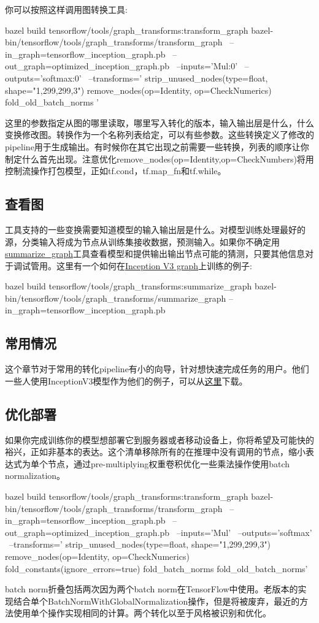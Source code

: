 你可以按照这样调用图转换工具:
\begin{bashcode}
bazel build tensorflow/tools/graph_transforms:transform_graph
bazel-bin/tensorflow/tools/graph_transforms/transform_graph \
--in_graph=tensorflow_inception_graph.pb \
--out_graph=optimized_inception_graph.pb \
--inputs='Mul:0' \
--outputs='softmax:0' \
--transforms='
strip_unused_nodes(type=float, shape="1,299,299,3")
remove_nodes(op=Identity, op=CheckNumerics)
fold_old_batch_norms
'
\end{bashcode}
这里的参数指定从图的哪里读取，哪里写入转化的版本，输入输出层是什么，什么变换修改图。转换作为一个名称列表给定，可以有些参数。这些转换定义了修改的pipeline用于生成输出。有时候你在其它出现之前需要一些转换，列表的顺序让你制定什么首先出现。注意优化remove\_nodes(op=Identity,op=CheckNumbers)将用控制流操作打包模型，正如tf.cond，tf.map\_fn和tf.while。
\subsection{查看图}
工具支持的一些变换需要知道模型的输入输出层是什么。对模型训练处理最好的源，分类输入将成为节点从训练集接收数据，预测输入。如果你不确定用\href{https://github.com/tensorflow/tensorflow/blob/master/tensorflow/tools/graph_transforms/summarize_graph_main.cc}{summarize\_graph}工具查看模型和提供输出输出节点可能的猜测，只要其他信息对于调试管用。这里有一个如何在\href{http://download.tensorflow.org/models/image/imagenet/inception-2015-12-05.tgz}{Inception V3 graph}上训练的例子:
\begin{bashcode}
bazel build tensorflow/tools/graph_transforms:summarize_graph
bazel-bin/tensorflow/tools/graph_transforms/summarize_graph --in_graph=tensorflow_inception_graph.pb 
\end{bashcode}
\subsection{常用情况}
这个章节对于常用的转化pipeline有小的向导，针对想快速完成任务的用户。他们一些人使用InceptionV3模型作为他们的例子，可以从\href{http://download.tensorflow.org/models/image/imagenet/inception-2015-12-05.tgz}{这里}下载。
\subsection{优化部署}
如果你完成训练你的模型想部署它到服务器或者移动设备上，你将希望及可能快的裕兴，正如非基本的表达。这个清单移除所有的在推理中没有调用的节点，缩小表达式为单个节点，通过pre-multiplying权重卷积优化一些乘法操作使用batch normalization。
\begin{bashcode}
bazel build tensorflow/tools/graph_transforms:transform_graph
bazel-bin/tensorflow/tools/graph_transforms/transform_graph \
--in_graph=tensorflow_inception_graph.pb \
--out_graph=optimized_inception_graph.pb \
--inputs='Mul' \
--outputs='softmax' \
--transforms='
  strip_unused_nodes(type=float, shape="1,299,299,3")
  remove_nodes(op=Identity, op=CheckNumerics)
  fold_constants(ignore_errors=true)
  fold_batch_norms
  fold_old_batch_norms'
\end{bashcode}
batch norm折叠包括两次因为两个batch norm在TensorFlow中使用。老版本的实现结合单个BatchNormWithGlobalNormalization操作，但是将被废弃，最近的方法使用单个操作实现相同的计算。两个转化以至于风格被识别和优化。

